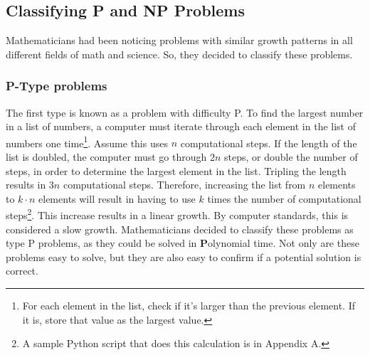 \documentclass[10pt,journal,compsoc]{IEEEtran}
\begin{document}
\subsection{Classifying P and NP Problems}
Mathematicians had been noticing problems with similar growth patterns in all different fields of math and science. So, they decided to classify these problems.

\subsubsection{P-Type problems} The first type is known as a problem with difficulty P. To find the largest number in a list of numbers, a computer must iterate through each element in the list of numbers one time\footnote{For each element in the list, check if it's larger than the previous element. If it is, store that value as the largest value.}. Assume this uses $n$ computational steps. If the length of the list is doubled, the computer must go through $2n$ steps, or double the number of steps, in order to determine the largest element in the list. Tripling the length results in $3n$ computational steps. Therefore, increasing the list from $n$ elements to $k\cdot n $ elements will result in having to use $k$ times the number of computational steps\footnote{A sample Python script that does this calculation is in Appendix A.}. This increase results in a linear growth. By computer standards, this is considered a slow growth. Mathematicians decided to classify these problems as type P problems, as they could be solved in  \textbf{P}olynomial time. Not only are these problems easy to solve, but they are also easy to confirm if a potential solution is correct. 
\end{document}
